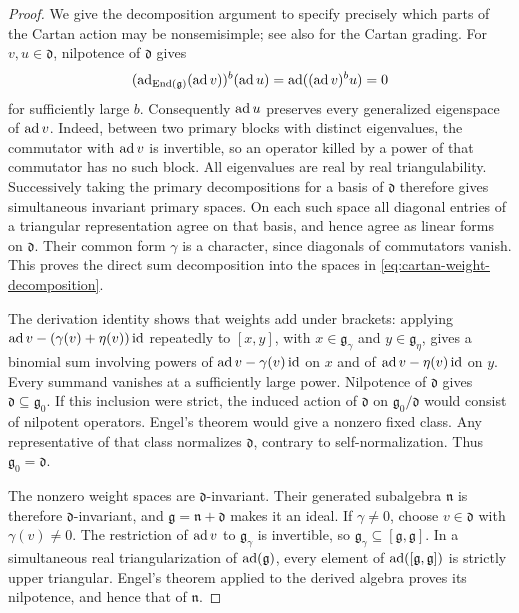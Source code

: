 \begin{proof}
We give the decomposition argument to specify precisely which parts of
the Cartan action may be nonsemisimple; see also
\cite[Section~4.D]{CornulierTessera2017} for the Cartan grading.
For $v,u\in\mathfrak d$, nilpotence of $\mathfrak d$ gives
\[
 (\operatorname{ad}_{\operatorname{End}(\mathfrak g)}(\operatorname{ad} v))^b(\operatorname{ad} u)
   =\operatorname{ad}((\operatorname{ad} v)^b u)=0
\]
for sufficiently large $b$.  Consequently $\operatorname{ad} u$ preserves every
generalized eigenspace of $\operatorname{ad} v$.  Indeed, between two primary blocks
with distinct eigenvalues, the commutator with $\operatorname{ad} v$ is invertible,
so an operator killed by a power of that commutator has no such block.
All eigenvalues are real by real triangulability.  Successively taking
the primary decompositions for a basis of $\mathfrak d$ therefore gives
simultaneous invariant primary spaces.  On each such space all diagonal
entries of a triangular representation agree on that basis, and hence
agree as linear forms on $\mathfrak d$.  Their common form $\gamma$ is a
character, since diagonals of commutators vanish.  This proves the direct
sum decomposition into the spaces in
\eqref{eq:cartan-weight-decomposition}.

The derivation identity shows that weights add under brackets: applying
$\operatorname{ad} v-(\gamma(v)+\eta(v))\operatorname{id}$ repeatedly to $[x,y]$, with
$x\in\mathfrak g_\gamma$ and $y\in\mathfrak g_\eta$, gives a binomial
sum involving powers of $\operatorname{ad} v-\gamma(v)\operatorname{id}$ on $x$ and of
$\operatorname{ad} v-\eta(v)\operatorname{id}$ on $y$.  Every summand vanishes at a sufficiently
large power.  Nilpotence of $\mathfrak d$ gives
$\mathfrak d\subseteq\mathfrak g_0$.  If this inclusion were strict,
the induced action of $\mathfrak d$ on $\mathfrak g_0/\mathfrak d$
would consist of nilpotent operators.  Engel's theorem would give a
nonzero fixed class.  Any representative of that class normalizes
$\mathfrak d$, contrary to self-normalization.  Thus
$\mathfrak g_0=\mathfrak d$.

The nonzero weight spaces are $\mathfrak d$-invariant.  Their generated
subalgebra $\mathfrak n$ is therefore $\mathfrak d$-invariant, and
$\mathfrak g=\mathfrak n+\mathfrak d$ makes it an ideal.  If
$\gamma\ne0$, choose $v\in\mathfrak d$ with $\gamma(v)\ne0$.
The restriction of $\operatorname{ad} v$ to $\mathfrak g_\gamma$ is invertible, so
$\mathfrak g_\gamma\subseteq[\mathfrak g,\mathfrak g]$.
In a simultaneous real triangularization of $\operatorname{ad}(\mathfrak g)$,
every element of $\operatorname{ad}([\mathfrak g,\mathfrak g])$ is strictly upper
triangular.  Engel's theorem applied to the derived algebra proves
its nilpotence, and hence that of $\mathfrak n$.


\end{proof}
